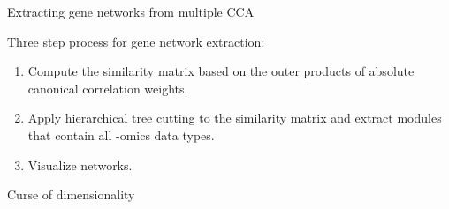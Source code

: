 \documentclass[ignorenonframetext,]{beamer}
\begin{document}
\begin{frame}{Extracting gene networks from multiple CCA}
\protect\hypertarget{extracting-gene-networks-from-multiple-cca}{}

Three step process for gene network extraction:

\begin{enumerate}
\item
  Compute the similarity matrix based on the outer products of absolute
  canonical correlation weights.
\item
  Apply hierarchical tree cutting to the similarity matrix and extract
  modules that contain all -omics data types.
\item
  Visualize networks.
\end{enumerate}

\end{frame}

\begin{frame}{Curse of dimensionality}
\protect\hypertarget{curse-of-dimensionality}{}

\end{frame}
\end{document}
